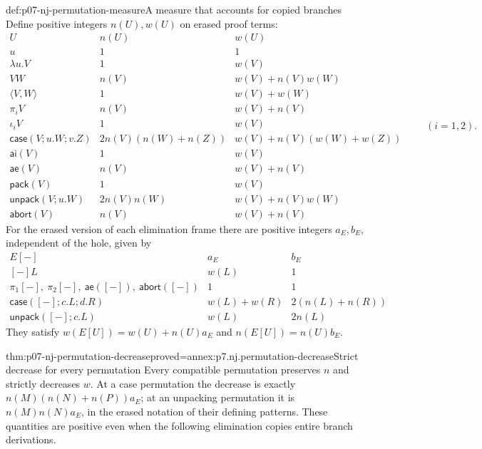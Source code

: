 \begin{hbdefinition}{def:p07-nj-permutation-measure}{A measure that accounts for copied branches}
Define positive integers \(n(U),w(U)\) on erased proof terms:
\[
\begin{array}{c|c|l}
U&n(U)&w(U)\\ \hline
u&1&1\\
\lambda u.V&1&w(V)\\
VW&n(V)&w(V)+n(V)w(W)\\
\langle V,W\rangle&1&w(V)+w(W)\\
\pi_iV&n(V)&w(V)+n(V)\\
\iota_iV&1&w(V)\\
\mathsf{case}(V;u.W;v.Z)&2n(V)(n(W)+n(Z))&
                 w(V)+n(V)(w(W)+w(Z))\\
\mathsf{ai}(V)&1&w(V)\\
\mathsf{ae}(V)&n(V)&w(V)+n(V)\\
\mathsf{pack}(V)&1&w(V)\\
\mathsf{unpack}(V;u.W)&2n(V)n(W)&w(V)+n(V)w(W)\\
\mathsf{abort}(V)&n(V)&w(V)+n(V)
\end{array}
\qquad (i=1,2).
\]
For the erased version of each elimination frame there are
positive integers \(a_E,b_E\), independent of the hole, given by
\[
\begin{array}{c|c|c}
E[-]&a_E&b_E\\ \hline
[-]L&w(L)&1\\
\pi_1[-],\ \pi_2[-],\ \mathsf{ae}([-]),\ \mathsf{abort}([-])&1&1\\
\mathsf{case}([-];c.L;d.R)&w(L)+w(R)&2(n(L)+n(R))\\
\mathsf{unpack}([-];c.L)&w(L)&2n(L)
\end{array}
\]
They satisfy \(w(E[U])=w(U)+n(U)a_E\) and
\(n(E[U])=n(U)b_E\).
\end{hbdefinition}

\begin{hblemma}{thm:p07-nj-permutation-decrease}{proved=annex:p7.nj.permutation-decrease}{Strict decrease for every permutation}
Every compatible permutation preserves \(n\) and strictly
decreases \(w\). At a case permutation the decrease is exactly
\(n(M)(n(N)+n(P))a_E\); at an unpacking permutation it is
\(n(M)n(N)a_E\), in the erased notation of their defining
patterns. These quantities are positive even when the following
elimination copies entire branch derivations.
\end{hblemma}

